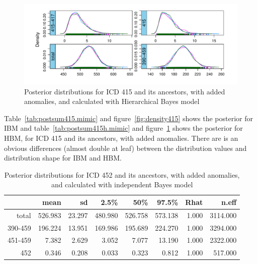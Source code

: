 \begin{figure}[!h]
	\centering
	\includegraphics[width=1\linewidth]{../../R-codes/JAGS/plots/mimic/Density415h}
	\caption{Posterior distributions for ICD 415 and its ancestors, with added anomalies, and calculated with Hierarchical Bayes model}
	\label{fig:density415h}
\end{figure}

Table~\ref{tab:postsum415.mimic} and figure~\ref{fig:density415} shows the posterior for IBM and table~\ref{tab:postsum415h.mimic} and figure~\ref{fig:density415h} shows the posterior for HBM, for ICD 415 and its ancestors, with added anomalies. There are is an obvious differences (almost double at leaf) between the distribution values and distribution shape for IBM and HBM.

\newpage%

\begin{table}[!t]
	\centering
	\begin{tabular}{rrrrrrrr}
		\hline
		& mean & sd & 2.5\% & 50\% & 97.5\% & Rhat & n.eff \\ 
		\hline
		total & 526.983 & 23.297 & 480.980 & 526.758 & 573.138 & 1.000 & 3114.000 \\ 
		390-459 & 196.224 & 13.951 & 169.986 & 195.689 & 224.270 & 1.000 & 3294.000 \\ 
		451-459 & 7.382 & 2.629 & 3.052 & 7.077 & 13.190 & 1.000 & 2322.000 \\ 
		452 & 0.346 & 0.208 & 0.033 & 0.323 & 0.812 & 1.000 & 517.000 \\ 
		\hline
	\end{tabular}
	\caption{Posterior distributions for ICD 452 and its ancestors, with added anomalies, and calculated with independent Bayes model} 
	\label{tab:postsum452.mimic}
\end{table}


